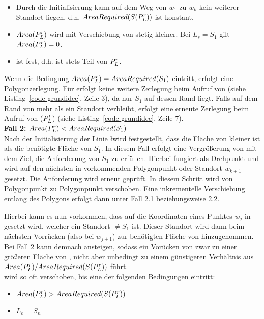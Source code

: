 \documentclass[ngerman]{seminarbeitrag}
\begin{document}
\begin{itemize}
\item Durch die Initialisierung kann auf dem Weg von $w_{1}$ zu $w_{k}$ kein weiterer Standort liegen, d.h. $AreaRequired(S(P_{L}^{r}))$ ist konstant.
\item $Area(P_{L}^{r})$ wird mit Verschiebung von \ls stetig kleiner. Bei $L_{s}=S_{1}$ gilt $Area(P_{L}^{r})=0$.
\item \Le ist fest, d.h. ist stets Teil von $P_{L}^{r}$.
\end{itemize}

Wenn die Bedingung $Area(P_{L}^{r})=AreaRequired(S_{1})$ eintritt, erfolgt eine Polygonzerlegung. Für \prl erfolgt keine weitere Zerlegung beim Aufruf von
\con (siehe Listing~\ref{code grundidee}, Zeile 3), da nur $S_{1}$ auf dessen Rand liegt. Falls auf dem Rand von \pll mehr als ein Standort verbleibt, erfolgt eine erneute
Zerlegung beim Aufruf von \con($P_{L}^{l}$) (siehe Listing~\ref{code grundidee}, Zeile 7).\\

\textbf{Fall 2: $Area(P_{L}^{r})<AreaRequired(S_{1})$} \\
Nach der Initialisierung der Linie \l wird festgestellt, dass die Fläche von \prl kleiner ist als die benötigte Fläche von $S_{1}$. In diesem Fall erfolgt eine Vergrößerung von \ar{\mprl}mit dem Ziel, die Anforderung von $S_{1}$ zu erfüllen. Hierbei fungiert \ls als Drehpunkt und \Le wird auf den nächsten in \w vorkommenden Polygonpunkt oder Standort $w_{k+1}$ gesetzt. Die Anforderung wird erneut geprüft. In diesem Schritt wird \Le von Polygonpunkt zu Polygonpunkt verschoben. Eine inkrementelle Verschiebung entlang des Polygons erfolgt dann unter Fall 2.1 beziehungsweise 2.2.

Hierbei kann es nun vorkommen, dass \Le auf die Koordinaten eines Punktes $w_{j}$ in \w gesetzt wird, welcher ein Standort $\ne S_{1}$ ist. Dieser Standort wird dann beim nächsten Vorrücken (also bei $w_{j+1}$) zur benötigten Fläche von \prl hinzugenommen. Bei Fall 2 kann \arreq{\mprl} demnach ansteigen, sodass ein Vorücken von \Le zwar zu einer größeren Fläche von \prl, nicht aber unbedingt zu einem günstigeren Verhältnis aus $Area(P_{L}^{r}) / AreaRequired(S(P_{L}^{r}))$ führt. \\
\Le wird so oft verschoben, bis eine der folgenden Bedingungen eintritt:\\

\begin{itemize}
\item $Area(P_{L}^{r})>AreaRequired(S(P_{L}^{r}))$
\item $L_{e} = S_{n}$
\end{itemize}
\end{document}
